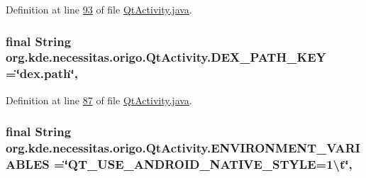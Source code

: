 Definition at line \hyperlink{_qt_activity_8java_source_l00093}{93} of file \hyperlink{_qt_activity_8java_source}{Qt\-Activity.\-java}.

\hypertarget{classorg_1_1kde_1_1necessitas_1_1origo_1_1_qt_activity_a4c2669f7673023d2fb9d3e8a5d9e82f7}{
\subsubsection[{D\-E\-X\-\_\-\-P\-A\-T\-H\-\_\-\-K\-E\-Y}]{\setlength{\rightskip}{0pt plus 5cm}final String org.\-kde.\-necessitas.\-origo.\-Qt\-Activity.\-D\-E\-X\-\_\-\-P\-A\-T\-H\-\_\-\-K\-E\-Y =\char`\"{}dex.\-path\char`\"{}\hspace{0.3cm}{\ttfamily [static]}, {\ttfamily [private]}}}\label{db/d37/classorg_1_1kde_1_1necessitas_1_1origo_1_1_qt_activity_a4c2669f7673023d2fb9d3e8a5d9e82f7}


Definition at line \hyperlink{_qt_activity_8java_source_l00087}{87} of file \hyperlink{_qt_activity_8java_source}{Qt\-Activity.\-java}.

\hypertarget{classorg_1_1kde_1_1necessitas_1_1origo_1_1_qt_activity_a4e69864219ca0057377c950f678ca5be}{
\subsubsection[{E\-N\-V\-I\-R\-O\-N\-M\-E\-N\-T\-\_\-\-V\-A\-R\-I\-A\-B\-L\-E\-S}]{\setlength{\rightskip}{0pt plus 5cm}final String org.\-kde.\-necessitas.\-origo.\-Qt\-Activity.\-E\-N\-V\-I\-R\-O\-N\-M\-E\-N\-T\-\_\-\-V\-A\-R\-I\-A\-B\-L\-E\-S =\char`\"{}Q\-T\-\_\-\-U\-S\-E\-\_\-\-A\-N\-D\-R\-O\-I\-D\-\_\-\-N\-A\-T\-I\-V\-E\-\_\-\-S\-T\-Y\-L\-E=1\textbackslash{}t\char`\"{}\hspace{0.3cm}{\ttfamily [static]}, {\ttfamily [private]}}}\label{db/d37/classorg_1_1kde_1_1necessitas_1_1origo_1_1_qt_activity_a4e69864219ca0057377c950f678ca5be}


